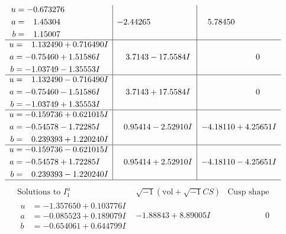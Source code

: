 \documentclass[1p]{elsarticle_modified}
\theoremstyle{definition}
\newcommand{\I}{\sqrt{-1}}
\begin{document}
$$\begin{array}{c|c|c}
\begin{aligned}
u &= -0.673276\phantom{ +0.000000I} \\
a &= \phantom{-}1.45304\phantom{ +0.000000I} \\
b &= \phantom{-}1.15007\phantom{ +0.000000I}\end{aligned}
 & -2.44265\phantom{ +0.000000I} & \phantom{-}5.78450\phantom{ +0.000000I} \\ \hline\begin{aligned}
u &= \phantom{-}1.132490 + 0.716490 I \\
a &= -0.75460 + 1.51586 I \\
b &= -1.03749 - 1.35553 I\end{aligned}
 & \phantom{-}3.7143 - 17.5584 I & \phantom{-0.000000 } 0 \\ \hline\begin{aligned}
u &= \phantom{-}1.132490 - 0.716490 I \\
a &= -0.75460 - 1.51586 I \\
b &= -1.03749 + 1.35553 I\end{aligned}
 & \phantom{-}3.7143 + 17.5584 I & \phantom{-0.000000 } 0 \\ \hline\begin{aligned}
u &= -0.159736 + 0.621015 I \\
a &= -0.54578 - 1.72285 I \\
b &= \phantom{-}0.239393 + 1.220240 I\end{aligned}
 & \phantom{-}0.95414 - 2.52910 I & -4.18110 + 4.25651 I \\ \hline\begin{aligned}
u &= -0.159736 - 0.621015 I \\
a &= -0.54578 + 1.72285 I \\
b &= \phantom{-}0.239393 - 1.220240 I\end{aligned}
 & \phantom{-}0.95414 + 2.52910 I & -4.18110 - 4.25651 I\\
 \hline 
 \end{array}$$\newpage$$\begin{array}{c|c|c}  
\text{Solutions to }I^u_{1}& \I (\text{vol} + \sqrt{-1}CS) & \text{Cusp shape}\\
 \hline 
\begin{aligned}
u &= -1.357650 + 0.103776 I \\
a &= -0.085523 + 0.189079 I \\
b &= -0.654061 + 0.644799 I\end{aligned}
 & -1.88843 + 8.89005 I & \phantom{-0.000000 } 0 \\ \hline\begin{aligned}

\end{aligned}
\end{array}$$
\end{document}
